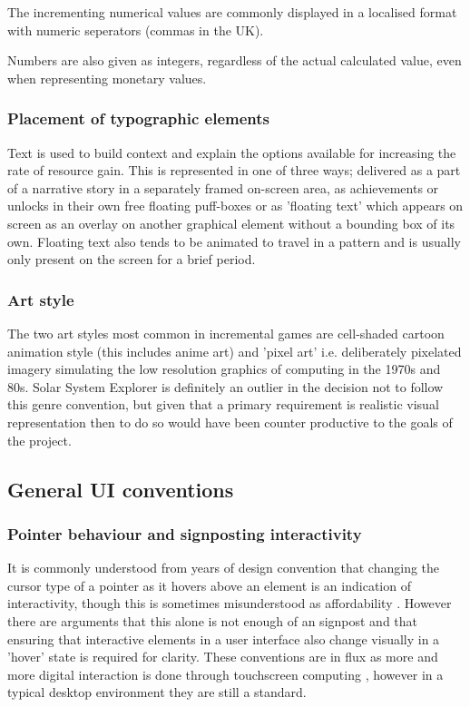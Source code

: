 \documentclass[twoside]{bhamthesis}
\begin{document}
The incrementing numerical values are commonly displayed in a localised format with numeric seperators (commas in the UK).

Numbers are also given as integers, regardless of the actual calculated value, even when representing monetary values.



\subsubsection{Placement of typographic elements}

Text is used to build context and explain the options available for increasing the rate of resource gain. This is represented in one of three ways; delivered as a part of a narrative story in a separately framed on-screen area, as achievements or unlocks in their own free floating puff-boxes or as 'floating text' which appears on screen as an overlay on another graphical element without a bounding box of its own. Floating text also tends to be animated to travel in a pattern and is usually only present on the screen for a brief period.

\subsubsection{Art style}

The two art styles most common in incremental games are cell-shaded cartoon animation style (this includes anime art) and 'pixel art' i.e. deliberately pixelated imagery simulating the low resolution graphics of computing in the 1970s and 80s. Solar System Explorer is definitely an outlier in the decision not to follow this genre convention, but given that a primary requirement is realistic visual representation then to do so would have been counter productive to the goals of the project.

\subsection{General UI conventions}

\subsubsection{Pointer behaviour and signposting interactivity}

It is commonly understood from years of design convention that changing the cursor type of a pointer as it hovers above an element is an indication of interactivity, though this is sometimes misunderstood as affordability \cite{norman_affordance_1999}. However there are arguments that this alone is not enough of an signpost and that ensuring that interactive elements in a user interface also change visually in a 'hover' state is required for clarity. These conventions are in flux as more and more digital interaction is done through touchscreen computing \cite{inostroza_usability_2012}, however in a typical desktop environment they are still a standard.
\end{document}
